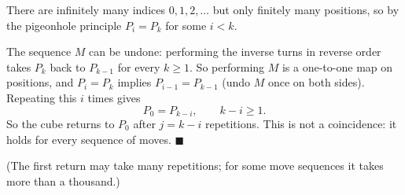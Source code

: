 There are infinitely many indices $0,1,2,\dots$ but only finitely many positions, so by the pigeonhole principle $P_i=P_k$ for some $i<k$.

The sequence $M$ can be undone: performing the inverse turns in reverse order takes $P_{k}$ back to $P_{k-1}$ for every $k\ge1$. So performing $M$ is a one-to-one map on positions, and $P_i=P_k$ implies $P_{i-1}=P_{k-1}$ (undo $M$ once on both sides). Repeating this $i$ times gives
\[P_0=P_{k-i},\qquad k-i\ge1.\]
So the cube returns to $P_0$ after $j=k-i$ repetitions. This is not a coincidence: it holds for every sequence of moves. $\blacksquare$

(The first return may take many repetitions; for some move sequences it takes more than a thousand.)
